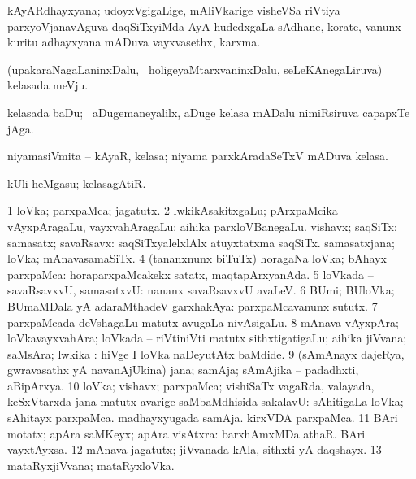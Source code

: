 \begin{center}
\bentry
{} 
\gl{\nA}
\expl{}
\bmng
kAyARdhayxyana; udoyxVgigaLige, mAliVkarige visheVSa riVtiya parxyoVjanavAguva daqSiTxyiMda AyA hudedxgaLa sAdhane, korate, \mo vanunx kuritu adhayxyana mADuva vayxvasethx, karxma. 
\emng
\eentry

\bentry
{} 
\gl{\nA}
\expl{}
\bmng
(upakaraNagaLaninxDalu, \kanmu\ holigeyaMtarxvaninxDalu, seLeKAnegaLiruva) kelasada meVju. 
\emng
\eentry

\bentry
{} 
\gl{\nA}
\expl{}
\bmng
kelasada baDu; \kanmu\ aDugemaneyalilx, aDuge kelasa mADalu nimiRsiruva capapxTe jAga. 
\emng
\eentry

\bentry
{} 
\gl{\nA}
\expl{}
\bmng
niyamasiVmita -- kAyaR, kelasa; niyama parxkAradaSeTxV mADuva kelasa. 
\emng
\eentry

\bentry
{} 
\gl{\nA}
\bmng
kUli heMgasu; kelasagAtiR. 
\emng
\eentry

\bentry
{} 
\gl{\nA}
\expl{}
\bmng
% 
\bnum
\num{1} loVka; parxpaMca; jagatutx. 
\num{2} lwkikAsakitxgaLu; pArxpaMcika vAyxpAragaLu, vayxvahAragaLu; aihika parxloVBanegaLu. 
\banum
{} vishavx; saqSiTx; samasatx; savaRsavx:  saqSiTxyalelxlAlx atuyxtatxma saqSiTx. 
 samasatxjana; loVka; mAnavasamaSiTx. 
\eanum
\numie
\num{4} (tananxnunx biTuTx) horagaNa loVka; bAhayx parxpaMca:  horaparxpaMcakekx satatx, maqtapArxyanAda. 
\num{5} loVkada -- savaRsavxvU, samasatxvU:  nananx savaRsavxvU avaLeV. 
\num{6} BUmi; BUloVka; BUmaMDala yA adaraMthadeV garxhakAya:  parxpaMcavanunx sututx. 
\num{7} parxpaMcada deVshagaLu matutx avugaLa nivAsigaLu. 
\num{8} mAnava vAyxpAra; loVkavayxvahAra; loVkada -- riVtiniVti matutx sithxtigatigaLu; aihika jiVvana; saMsAra; lwkika :  hiVge I loVka naDeyutAtx baMdide. 
\num{9} (sAmAnayx dajeRya, gwravasathx yA navanAjUkina) jana; samAja; sAmAjika -- padadhxti, aBipArxya. 
\num{10} loVka; vishavx; parxpaMca; vishiSaTx vagaRda, valayada, keSxVtarxda jana matutx avarige saMbaMdhisida sakalavU:    sAhitigaLa loVka; sAhitayx parxpaMca.  madhayxyugada samAja.  kirxVDA parxpaMca. 
\num{11} BAri motatx; apAra saMKeyx; apAra visAtxra:  barxhAmxMDa athaR.  BAri vayxtAyxsa. 
\num{12} mAnava jagatutx; jiVvanada kAla, sithxti yA daqshayx. 
\num{13} mataRyxjiVvana; mataRyxloVka. 
\enum
\emng


\end{center}
